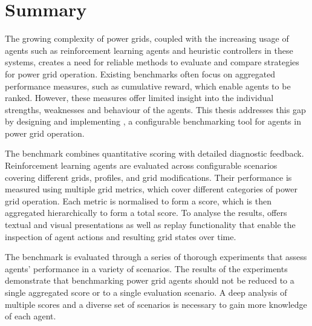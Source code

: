 \chapter*{Summary}


The growing complexity of power grids, coupled with the increasing usage of agents such as reinforcement learning agents and heuristic controllers in these systems, creates a need for reliable methods to evaluate and compare strategies for power grid operation. Existing benchmarks often focus on aggregated performance measures, such as cumulative reward, which enable agents to be ranked. However, these measures offer limited insight into the individual strengths, weaknesses and behaviour of the agents. This thesis addresses this gap by designing and implementing \benchmark, a configurable benchmarking tool for agents in power grid operation.

The benchmark combines quantitative scoring with detailed diagnostic feedback. Reinforcement learning agents are evaluated across configurable scenarios covering different grids, profiles, and grid modifications. Their performance is measured using multiple grid metrics, which cover different categories of power grid operation. Each metric is normalised to form a score, which is then aggregated hierarchically to form a total score. To analyse the results, \benchmark offers textual and visual presentations as well as replay functionality that enable the inspection of agent actions and resulting grid states over time.

The benchmark is evaluated through a series of thorough experiments that assess agents' performance in a variety of scenarios. The results of the experiments demonstrate that benchmarking power grid agents should not be reduced to a single aggregated score or to a single evaluation scenario. A deep analysis of multiple scores and a diverse set of scenarios is necessary to gain more knowledge of each agent.